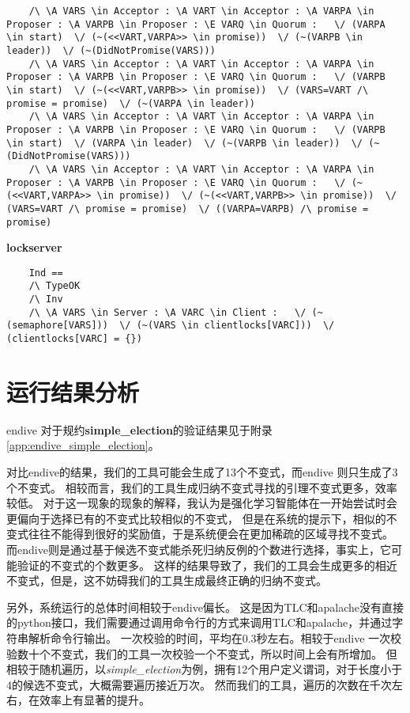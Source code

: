 \begin{lstlisting}
    /\ \A VARS \in Acceptor : \A VART \in Acceptor : \A VARPA \in Proposer : \A VARPB \in Proposer : \E VARQ \in Quorum :   \/ (VARPA \in start)  \/ (~(<<VART,VARPA>> \in promise))  \/ (~(VARPB \in leader))  \/ (~(DidNotPromise(VARS)))
    /\ \A VARS \in Acceptor : \A VART \in Acceptor : \A VARPA \in Proposer : \A VARPB \in Proposer : \E VARQ \in Quorum :   \/ (VARPB \in start)  \/ (~(<<VART,VARPB>> \in promise))  \/ (VARS=VART /\ promise = promise)  \/ (~(VARPA \in leader))
    /\ \A VARS \in Acceptor : \A VART \in Acceptor : \A VARPA \in Proposer : \A VARPB \in Proposer : \E VARQ \in Quorum :   \/ (VARPB \in start)  \/ (VARPA \in leader)  \/ (~(VARPB \in leader))  \/ (~(DidNotPromise(VARS)))
    /\ \A VARS \in Acceptor : \A VART \in Acceptor : \A VARPA \in Proposer : \A VARPB \in Proposer : \E VARQ \in Quorum :   \/ (~(<<VART,VARPA>> \in promise))  \/ (~(<<VART,VARPB>> \in promise))  \/ (VARS=VART /\ promise = promise)  \/ ((VARPA=VARPB) /\ promise = promise)
\end{lstlisting}

\textbf{lockserver}
\begin{lstlisting}
    Ind == 
    /\ TypeOK
    /\ Inv
    /\ \A VARS \in Server : \A VARC \in Client :   \/ (~(semaphore[VARS]))  \/ (~(VARS \in clientlocks[VARC]))  \/ (clientlocks[VARC] = {})
\end{lstlisting}

\section{运行结果分析}
endive 对于规约\textbf{simple\_election}的验证结果见于附录\ref{app:endive_simple_election}。

对比endive的结果，我们的工具可能会生成了13个不变式，而endive 则只生成了3个不变式。
相较而言，我们的工具生成归纳不变式寻找的引理不变式更多，效率较低。
对于这一现象的现象的解释，我认为是强化学习智能体在一开始尝试时会更偏向于选择已有的不变式比较相似的不变式，
但是在系统的提示下，相似的不变式往往不能得到很好的奖励值，于是系统便会在更加稀疏的区域寻找不变式。
而endive则是通过基于候选不变式能杀死归纳反例的个数进行选择，事实上，它可能验证的不变式的个数更多。
这样的结果导致了，我们的工具会生成更多的相近不变式，但是，这不妨碍我们的工具生成最终正确的归纳不变式。

另外，系统运行的总体时间相较于endive偏长。
这是因为TLC和apalache没有直接的python接口，我们需要通过调用命令行的方式来调用TLC和apalache，并通过字符串解析命令行输出。
一次校验的时间，平均在0.3秒左右。相较于endive 一次校验数十个不变式，我们的工具一次校验一个不变式，所以时间上会有所增加。
但相较于随机遍历，以\textit{simple\_election}为例，拥有12个用户定义谓词，对于长度小于4的候选不变式，大概需要遍历接近万次。
然而我们的工具，遍历的次数在千次左右，在效率上有显著的提升。


